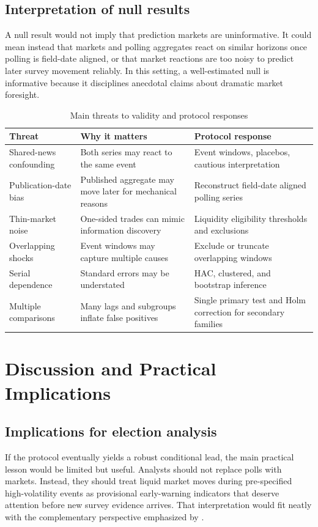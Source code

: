 \documentclass[11pt]{article}
\begin{document}
\subsection{Interpretation of null results}
A null result would not imply that prediction markets are uninformative. It could mean instead that markets and polling aggregates react on similar horizons once polling is field-date aligned, or that market reactions are too noisy to predict later survey movement reliably. In this setting, a well-estimated null is informative because it disciplines anecdotal claims about dramatic market foresight.

\begin{table}[t]
\centering
\caption{Main threats to validity and protocol responses}
\begin{tabular}{p{4.0cm}p{6.1cm}p{3.3cm}}
\toprule
Threat & Why it matters & Protocol response \\
\midrule
Shared-news confounding & Both series may react to the same event & Event windows, placebos, cautious interpretation \\
Publication-date bias & Published aggregate may move later for mechanical reasons & Reconstruct field-date aligned polling series \\
Thin-market noise & One-sided trades can mimic information discovery & Liquidity eligibility thresholds and exclusions \\
Overlapping shocks & Event windows may capture multiple causes & Exclude or truncate overlapping windows \\
Serial dependence & Standard errors may be understated & HAC, clustered, and bootstrap inference \\
Multiple comparisons & Many lags and subgroups inflate false positives & Single primary test and Holm correction for secondary families \\
\bottomrule
\end{tabular}
\end{table}

\section{Discussion and Practical Implications}

\subsection{Implications for election analysis}
If the protocol eventually yields a robust conditional lead, the main practical lesson would be limited but useful. Analysts should not replace polls with markets. Instead, they should treat liquid market moves during pre-specified high-volatility events as provisional early-warning indicators that deserve attention before new survey evidence arrives. That interpretation would fit neatly with the complementary perspective emphasized by \citet{modelsmarketsandth2021arxiv}.
\end{document}
